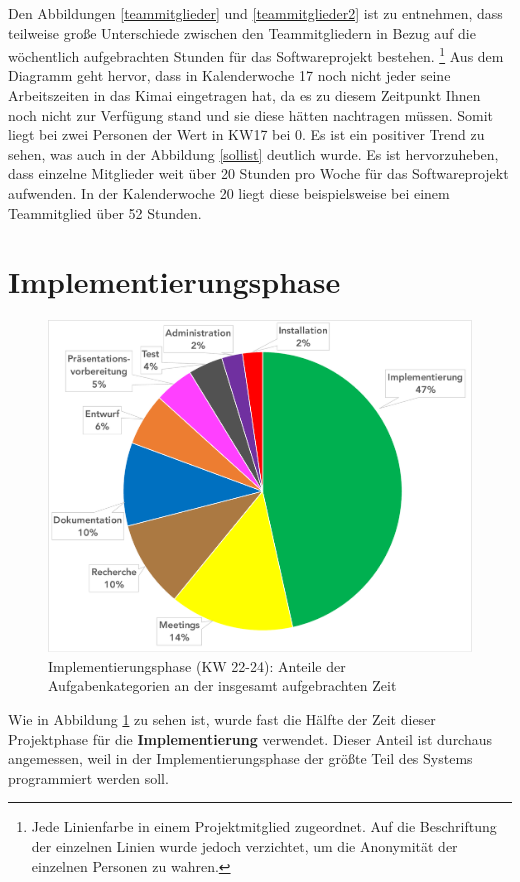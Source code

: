 \documentclass[../review_2.tex]{subfiles}
\begin{document}
Den Abbildungen \ref{teammitglieder} und \ref{teammitglieder2} ist zu entnehmen, dass teilweise große Unterschiede zwischen den Teammitgliedern in Bezug auf die wöchentlich aufgebrachten Stunden für das Softwareprojekt bestehen. \footnote{\noindent Jede Linienfarbe in einem Projektmitglied zugeordnet. Auf die Beschriftung der einzelnen Linien wurde jedoch verzichtet, um die Anonymität der einzelnen Personen zu wahren.}
Aus dem Diagramm geht hervor, dass in Kalenderwoche 17 noch nicht jeder seine Arbeitszeiten in das Kimai eingetragen hat, da es zu diesem Zeitpunkt Ihnen noch nicht zur Verfügung stand und sie diese hätten nachtragen müssen. Somit liegt bei zwei Personen der Wert in KW17 bei 0.
Es ist ein positiver Trend zu sehen, was auch in der Abbildung \ref{sollist} deutlich wurde.
Es ist hervorzuheben, dass einzelne Mitglieder weit über 20 Stunden pro Woche für das Softwareprojekt aufwenden. In der Kalenderwoche 20 liegt diese beispielsweise bei einem Teammitglied über 52 Stunden.


\section{Implementierungsphase}
\begin{figure} [h]
    \centering
    \includegraphics[width = \linewidth]{img/kimai5.pdf}
    \caption{Implementierungsphase (KW 22-24): Anteile der Aufgabenkategorien an der insgesamt aufgebrachten Zeit}
    \label{kimai5}
\end{figure} 
Wie in Abbildung \ref{kimai5} zu sehen ist, wurde fast die Hälfte der Zeit dieser Projektphase für die \textbf{Implementierung} verwendet. Dieser Anteil ist durchaus angemessen, weil in der Implementierungsphase der größte Teil des Systems programmiert werden soll.
\end{document}
